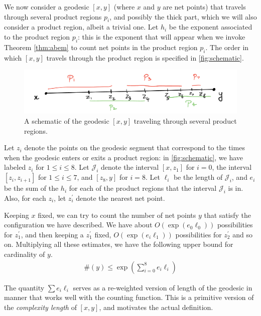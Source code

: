 \documentclass[12pt, reqno]{amsart}
\begin{document}
We now consider a geodesic $[x,y]$ (where $x$ and $y$ are net points) that travels through several product regions $p_i$, and possibly the thick part, which we will also consider a product region, albeit a trivial one.
Let $h_i$ be the exponent associated to the product region $p_i$: this is the exponent that will appear when we invoke Theorem \ref{thm:abem} to count net points in the product region $p_i$.
The order in which $[x, y]$ travels through the product region is specified in \autoref{fig:schematic}.
\begin{figure}[h]
  \centering
  \includegraphics[scale=0.5]{images/schematic.png}
  \caption{A schematic of the geodesic $[x,y]$ traveling through several product regions.}
  \label{fig:schematic}
\end{figure}

Let $z_i$ denote the points on the geodesic segment that correspond to the times when the geodesic enters or exits a product region: in \autoref{fig:schematic}, we have labeled $z_i$ for $1 \leq i \leq 8$.
Let $\mathcal{J}_i$ denote the interval $[x, z_1]$ for $i=0$, the interval $[z_i, z_{i+1}]$ for $1 \leq i \leq 7$, and $[z_8, y]$ for $i=8$.
Let $\ell_i$ be the length of $\mathcal{J}_i$, and $e_i$ be the sum of the $h_i$ for each of the product regions that the interval $\mathcal{J}_i$ is in.
Also, for each $z_i$, let $z_i^{\prime}$ denote the nearest net point.

Keeping $x$ fixed, we can try to count the number of net points $y$ that satisfy the configuration we have described.
We have about $O(\exp(e_0 \ell_0))$ possibilities for $z_1^{\prime}$, and then keeping a $z_1^{\prime}$ fixed, $O(\exp(e_i \ell_1))$ possibilities for $z_2^{\prime}$ and so on.
Multiplying all these estimates, we have the following upper bound for cardinality of $y$.
\begin{align*}
  \#\left( y \right) \leq \exp\left( \sum_{i=0}^8 e_i \ell_i \right)
\end{align*}

The quantity $\sum e_i \ell_i$ serves as a re-weighted version of length of the geodesic in manner that works well with the counting function.
This is a primitive version of the \emph{complexity length} of $[x,y]$, and motivates the actual definition.
\end{document}
